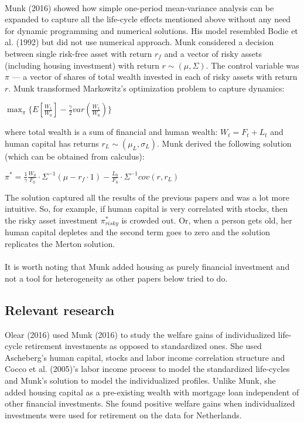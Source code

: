 \documentclass[]{article}
\begin{document}
\paragraph*{}Munk (2016) showed how simple one-period mean-variance analysis can be expanded to capture all the life-cycle effects mentioned above without any need for dynamic programming and numerical solutions. His model resembled Bodie et al. (1992) but did not use numerical approach. Munk considered a decision between single risk-free asset with return $r_f$ and a vector of risky assets (including housing investment) with return $r \sim (\mu, \Sigma)$. The control variable was $\pi$ --- a vector of shares of total wealth invested in each of risky assets with return $r$. Munk transformed Markowitz's optimization problem to capture dynamics:


\begin{center}
	$ \displaystyle\max_{\pi} \{ E[\frac{W_1}{W_0}] - \frac{\gamma}{2} var(\frac{W_1}{W_0}) \} $
\end{center}

where total wealth is a sum of financial and human wealth: $W_t = F_t + L_t$ and human capital has returns $r_L \sim (\mu_L, \sigma_L)$. Munk derived the following solution (which can be obtained from calculus):

\begin{center}
	$\pi^* = \frac{1}{\gamma} \frac{W_0}{F_0} \cdot \Sigma^{-1} (\mu - r_f \cdot 1) - \frac{L_0}{F_0} \cdot \Sigma^{-1} cov(r,r_L)$
\end{center}

The solution captured all the results of the previous papers and was a lot more intuitive. So, for example, if human capital is very correlated with stocks, then the risky asset investment $\pi^*_{risky}$ is crowded out. Or, when a person gets old, her human capital depletes and the second term goes to zero and the solution replicates the Merton solution.

\paragraph{}It is worth noting that Munk added housing as purely financial investment and not a tool for heterogeneity as other papers below tried to do. 

\subsection{Relevant research}
Olear (2016) used Munk (2016) to study the welfare gains of individualized life-cycle retirement investments as opposed to standardized ones. She used Ascheberg's human capital, stocks and labor income correlation structure and Cocco et al. (2005)'s labor income process to model the standardized life-cycles and Munk's solution to model the individualized profiles. Unlike Munk, she added housing capital as a pre-existing wealth with mortgage loan independent of other financial investments. She found positive welfare gains when individualized investments were used for retirement on the data for Netherlands.
\end{document}
